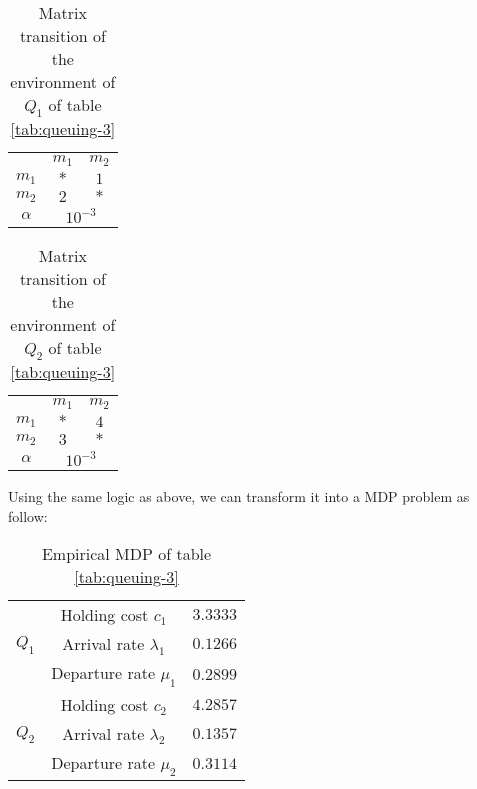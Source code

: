 \documentclass[
  a4paper, xcolor = usenames,dvipsnames]{article}
\theoremstyle{definition}
\theoremstyle{definition}
\theoremstyle{definition}
\theoremstyle{definition}
\theoremstyle{remark}
\begin{document}
\begin{table}[!htbp]
\caption{Matrix transition of the environment of $Q_{1}$ of table \ref{tab:queuing-3}}
\begin{center}
\begin{tabular}{c c c}
    \hline
    & $m_{1}$ & $m_{2}$ \\
    $m_{1}$ & $*$ & $1$ \\
    $m_{2}$ & $2$ & $*$ \\
    \hline
    $\alpha$ & \multicolumn{2}{c}{$10^{-3}$} \\
    \hline
\end{tabular}
\end{center}
\label{tab:queuing-3-mat-1}
\end{table}

\begin{table}[!htbp]
\caption{Matrix transition of the environment of $Q_{2}$ of table \ref{tab:queuing-3}}
\begin{center}
\begin{tabular}{c c c}
    \hline
    & $m_{1}$ & $m_{2}$ \\
    $m_{1}$ & $*$ & $4$ \\
    $m_{2}$ & $3$ & $*$ \\
    \hline
    $\alpha$ & \multicolumn{2}{c}{$10^{-3}$} \\
    \hline
\end{tabular}
\end{center}
\label{tab:queuing-3-mat-2}
\end{table}

Using the same logic as above, we can transform it into a MDP problem as follow:

\begin{table}[!htbp]
\caption{Empirical MDP of table \ref{tab:queuing-3}}
\begin{center}
\begin{tabular}{c c c}
    \hline
    \multirow{3}{*}{$Q_{1}$} & Holding cost $c_{1}$ & $3.3333$ \\
    & Arrival rate $\lambda_{1}$ & $0.1266$ \\
    & Departure rate $\mu_{1}$ & $0.2899$ \\
    \cline{2-3}
    \multirow{3}{*}{$Q_{2}$} & Holding cost $c_{2}$ & $4.2857$ \\
    & Arrival rate $\lambda_{2}$ & $0.1357$ \\
    & Departure rate $\mu_{2}$ & $0.3114$ \\    
    \hline
\end{tabular}
\end{center}
\label{tab:mdp-queuing-3}
\end{table}
\end{document}
